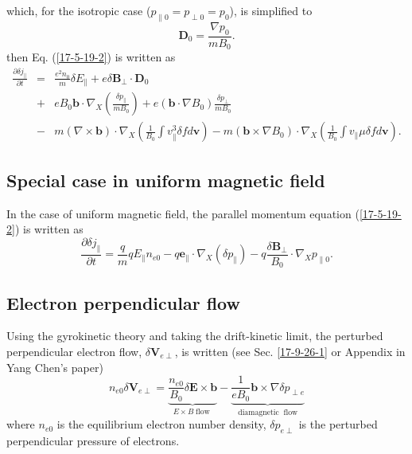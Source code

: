 \documentclass{article}
\newcommand{\tmop}[1]{\ensuremath{\operatorname{#1}}}
\begin{document}
which, for the isotropic case ($p_{\parallel 0} = p_{\perp 0} = p_0$), is
simplified to
\begin{equation}
  \mathbf{D}_0 = \frac{\nabla p_0}{m B_0} .
\end{equation}
then Eq. (\ref{17-5-19-2}) is written as
\begin{eqnarray}
  \frac{\partial \delta j_{\parallel}}{\partial t} & = & \frac{e^2 n_0}{m}
  \delta E_{\parallel} + e \delta \mathbf{B}_{\perp} \cdot \mathbf{D}_0
  \nonumber\\
  & + & e B_0 \mathbf{b} \cdot \nabla_X \left( \frac{\delta p_{\parallel}}{m
  B_0} \right) + e (\mathbf{b} \cdot \nabla B_0) \frac{\delta p_{\perp}}{m
  B_0} \nonumber\\
  & - & m (\nabla \times \mathbf{b}) \cdot \nabla_X \left( \frac{1}{B_0} \int
  v_{\parallel}^3 \delta f d\mathbf{v} \right) - m (\mathbf{b} \times \nabla
  B_0) \cdot \nabla_X \left( \frac{1}{B_0} \int v_{\parallel} \mu \delta f
  d\mathbf{v} \right) . 
\end{eqnarray}


\subsection{Special case in uniform magnetic field}

In the case of uniform magnetic field, the parallel momentum equation
(\ref{17-5-19-2}) is written as
\begin{equation}
  \label{17-5-15-p8} \frac{\partial \delta j_{\parallel}}{\partial t} =
  \frac{q}{m} q E_{\parallel} n_{e 0} - q\mathbf{e}_{\parallel} \cdot \nabla_X
  (\delta p_{\parallel}) - q \frac{\delta \mathbf{B}_{\perp}}{B_0} \cdot
  \nabla_X p_{\parallel 0} .
\end{equation}

\subsection{Electron perpendicular flow}

Using the gyrokinetic theory and taking the drift-kinetic limit, the perturbed
perpendicular electron flow, $\delta \mathbf{V}_{e \perp}$, is written (see
Sec. \ref{17-9-26-1} or Appendix in Yang Chen's paper{\cite{ychen2009}})
\begin{equation}
  \label{17-5-8-1} n_{e 0} \delta \mathbf{V}_{e \perp} =
  \underbrace{\frac{n_{e 0}}{B_0} \delta \mathbf{E} \times \mathbf{b}}_{E
  \times B \tmop{flow}} - \underbrace{\frac{1}{e B_0} \mathbf{b} \times \nabla
  \delta p_{\perp e}}_{\tmop{diamagnetic} \tmop{flow}}
\end{equation}
where $n_{e 0}$ is the equilibrium electron number density, $\delta p_{e
\perp}$ is the perturbed perpendicular pressure of electrons.
\end{document}
